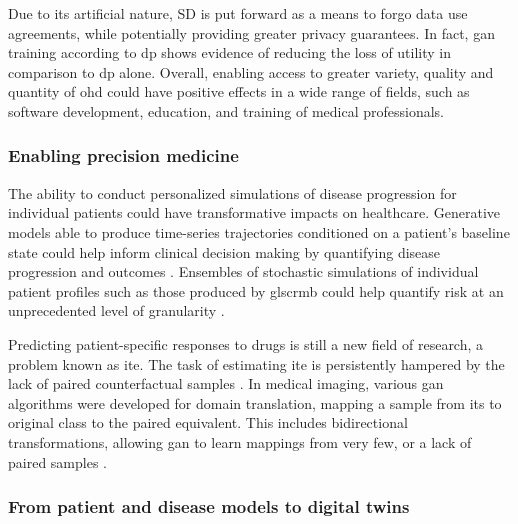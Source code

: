             Due to its artificial nature, SD is put forward as a means to forgo data use agreements, while potentially providing greater privacy guarantees\cite{Beaulieu-Jones2019-ct, baowaly_2019_IEEE, baowaly_2019_jamia,esteban2017real,Fisher2019,walsh2020generating, chin2019generation}. In fact, \gls{gan} training according to \gls{dp} shows evidence of reducing the loss of utility in comparison to \gls{dp} alone.  Overall, enabling access to greater variety, quality and quantity of \gls{ohd} could have positive effects in a wide range of fields, such as software development, education, and training of medical professionals. 
    
        \subsubsection{Enabling precision medicine}\label{sec:precision_med}
    
            The ability to conduct personalized simulations of disease progression for individual patients could have transformative impacts on healthcare. Generative models able to produce time-series trajectories conditioned on a patient's baseline state could help inform clinical decision making by quantifying disease progression and outcomes \cite{walsh2020generating, Fisher2019}. Ensembles of stochastic simulations of individual patient profiles such as those produced by gls{crmb} could help quantify risk at an unprecedented level of granularity \cite{Fisher2019}.\par
            Predicting patient-specific responses to drugs is still a new field of research, a problem known as \gls{ite}. The task of estimating \gls{ite} is persistently hampered by the lack of paired counterfactual samples \cite{Yoon2018-ite, chu2019treatment}. In medical imaging, various \gls{gan} algorithms were developed for domain translation, mapping a sample from its to original class to the paired equivalent. This includes bidirectional transformations, allowing \gls{gan} to learn mappings from very few, or a lack of paired samples \cite{Wolterink2017DeepMT}.
    
        \subsubsection{From patient and disease models to digital twins}\label{sec:models_twins}
    

